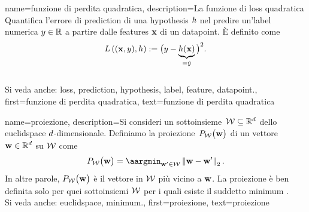 {name={funzione di perdita quadratica},
	description={La funzione di \gls{loss} quadratica 
	Quantifica l’errore di \gls{prediction} di una 
		\gls{hypothesis} $h$ nel predire un'\gls{label} numerica $y \in \mathbb{R}$ 
		a partire dalle \glspl{feature} ${\bf x}$ di un \gls{datapoint}. È definito come 
		\begin{equation} 
			\nonumber
			L\left(({\bf x},y),h \right) := \big(y - \underbrace{h({\bf x})}_{=\hat{y}} \big)^{2}. 
		\end{equation} 
			\\ 
		Si veda anche: \gls{loss}, \gls{prediction}, \gls{hypothesis}, \gls{label}, \gls{feature}, \gls{datapoint}.},
	first={funzione di perdita quadratica},
	text={funzione di perdita quadratica}
}


 {name={proiezione}, 
       description={Si consideri un sottoinsieme  $\mathcal{W} \subseteq \mathbb{R}^{d}$ dello \gls{euclidspace} $d$-dimensionale. Definiamo la proiezione  $P_{\mathcal{W}}\big( {\bf w}\big)$
	   di un vettore ${\bf w} \in \mathbb{R}^{d}$ su $\mathcal{W}$ come
	   \begin{equation} 
   	   	\label{equ_def_proj_generic_dict}
  	    	\projection{\paramspace}{\weights} = \aargmin_{\weights' \in \paramspace} \normgeneric{\weights - \weights'}{2}. 
        	    \end{equation}
	    In altre parole, $P_{\mathcal{W}}\big( {\bf w}\big)$ è il vettore in $\mathcal{W}$ 
	    più vicino a ${\bf w}$. La proiezione è ben definita solo per quei sottoinsiemi $\mathcal{W}$ 
	    per i quali esiste il suddetto \gls{minimum} \cite{BoydConvexBook}.
		 			\\ 
	    Si veda anche: \gls{euclidspace}, \gls{minimum}.},
	first={proiezione},
	text={proiezione}
}


